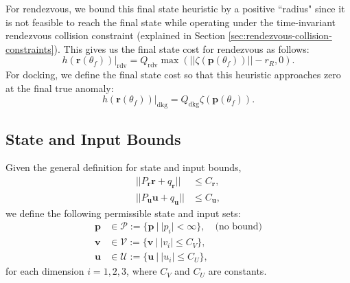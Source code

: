 For rendezvous, we bound this final state heuristic by a positive ``radius" since it is not feasible to reach the final state while operating under the time-invariant rendezvous collision constraint (explained in Section \ref{sec:rendezvous-collision-constraints}).
This gives us the final state cost for rendezvous as follows:
\begin{equation}
    \label{eqn:rendezvous-cost}
    h(\boldsymbol{r}(\theta_f))|_{\text{rdv}}=Q_\text{rdv}\max{\left(||\zeta(\boldsymbol{p}(\theta_f))||-r_R, 0\right)}.
\end{equation}
For docking, we define the final state cost so that this heuristic approaches zero at the final true anomaly:
\begin{equation}
    h(\boldsymbol{r}(\theta_f))|_{\text{dkg}}=Q_\text{dkg}\zeta(\boldsymbol{p}(\theta_f)).
\end{equation}
\subsection{State and Input Bounds}
\label{sec:state-input-bounds}
Given the general definition for state and input bounds, \cite{brett2019dynamic}
\begin{align}
    ||P_{\boldsymbol{r}}\boldsymbol{r}+q_{\boldsymbol{r}}||&\leq C_{\boldsymbol{r}},\\
    ||P_{\boldsymbol{u}}\boldsymbol{u}+q_{\boldsymbol{u}}||&\leq C_{\boldsymbol{u}},
\end{align}
we define the following permissible state and input sets:
\begin{align}
    \boldsymbol{p}&\in{\mathcal{P}}:=\{\boldsymbol{p}\ |\ |p_i|<    \infty\},\quad\text{(no bound)}\\
    \boldsymbol{v}&\in{\mathcal{V}}:=\{\boldsymbol{v}\ |\ |v_i|\leq C_{V}\},\\
    \boldsymbol{u}&\in{\mathcal{U}}:=\{\boldsymbol{u}\ |\ |u_i  |\leq C_{U}\},
\end{align}
for each dimension $i=1,2,3$, where $C_{V}$ and $C_{U}$ are constants.
